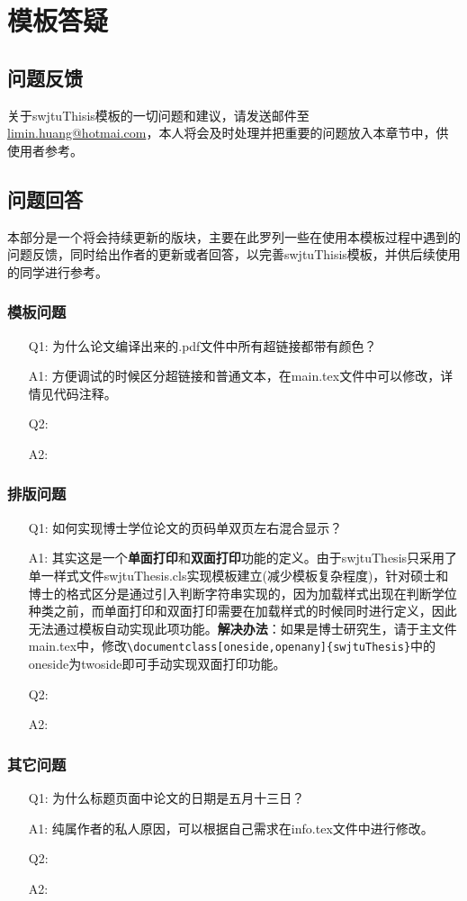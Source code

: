 \chapter{模板答疑}

\section{问题反馈}
关于swjtuThisis模板的一切问题和建议，请发送邮件至\href{mailto:limin.huang@hotmai.com}{limin.huang@hotmai.com}，本人将会及时处理并把重要的问题放入本章节中，供使用者参考。

\section{问题回答}
本部分是一个将会持续更新的版块，主要在此罗列一些在使用本模板过程中遇到的问题反馈，同时给出作者的更新或者回答，以完善swjtuThisis模板，并供后续使用的同学进行参考。

\subsection{模板问题}
\begin{enumerate}
	\item[Q1:]为什么论文编译出来的.pdf文件中所有超链接都带有颜色？
	\item[A1:]方便调试的时候区分超链接和普通文本，在main.tex文件中可以修改，详情见代码注释。
	\item[Q2:]
	\item[A2:]
\end{enumerate}

\subsection{排版问题}
\begin{enumerate}
	\item[Q1:]如何实现博士学位论文的页码单双页左右混合显示？
	\item[A1:]其实这是一个\textbf{单面打印}和\textbf{双面打印}功能的定义。由于swjtuThesis只采用了单一样式文件swjtuThesis.cls实现模板建立(减少模板复杂程度)，针对硕士和博士的格式区分是通过引入判断字符串实现的，因为加载样式出现在判断学位种类之前，而单面打印和双面打印需要在加载样式的时候同时进行定义，因此无法通过模板自动实现此项功能。\textbf{解决办法}：如果是博士研究生，请于主文件main.tex中，修改\verb|\documentclass[oneside,openany]{swjtuThesis}|中的oneside为twoside即可手动实现双面打印功能。	
	\item[Q2:]
	\item[A2:]
\end{enumerate}

\subsection{其它问题}
\begin{enumerate}
	\item[Q1:]为什么标题页面中论文的日期是五月十三日？
	\item[A1:]纯属作者的私人原因，可以根据自己需求在info.tex文件中进行修改。
	\item[Q2:]
	\item[A2:]
\end{enumerate}
